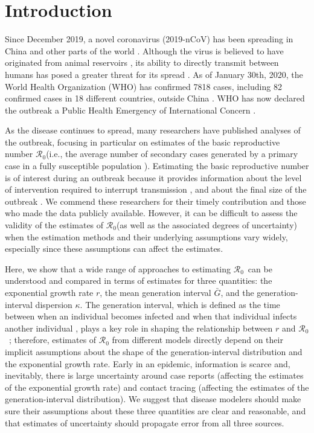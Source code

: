 \documentclass[12pt]{article}
\newcommand{\Rx}[1]{\ensuremath{{\mathcal R}_{#1}}}
\newcommand{\Ro}{\Rx{0}\xspace}
\begin{document}
\pagebreak

\section{Introduction}

Since December 2019, a novel coronavirus (2019-nCoV) has been spreading in China and other parts of the world \citep{pneumonia}.
Although the virus is believed to have originated from animal reservoirs \citep{cdcncov}, its ability to directly transmit between humans has posed a greater threat for its spread \citep{huang2020clinical,who26report}.
As of January 30th, 2020, the World Health Organization (WHO) has confirmed 7818 cases, including 82 confirmed cases in 18 different countries, outside China \citep{who28report}.
WHO has now declared the outbreak a Public Health Emergency of International Concern \citep{whoemer}.

As the disease continues to spread, many researchers have published analyses of the outbreak, focusing in particular on estimates of the basic reproductive number \Ro (i.e., the average number of secondary cases generated by a primary case in a fully susceptible population \citep{anderson1991infectious, diekmann1990definition}).
Estimating the basic reproductive number is of interest during an outbreak because it provides information about the level of intervention required to interrupt transmission \citep{anderson1991infectious}, and about the final size of the outbreak \citep{anderson1991infectious, ma2006generality}.
We commend these researchers for their timely contribution and those who made the data publicly available.
However, it can be difficult to assess the validity of the estimates of \Ro (as well as the associated degrees of uncertainty) when the estimation methods and their underlying assumptions vary widely, especially since these assumptions can affect the estimates.

Here, we show that a wide range of approaches to estimating \Ro\ can be understood and compared in terms of estimates for three quantities: the exponential growth rate $r$, the mean generation interval $\bar G$, and the generation-interval dispersion $\kappa$.
The generation interval, which is defined as the time between when an individual becomes infected and when that individual infects another individual \citep{svensson2007note}, plays a key role in shaping the relationship between $r$ and \Ro\ \citep{wearing2005appropriate, roberts2007model, wallinga2007generation, park2019practical};
therefore, estimates of $\mathcal R_0$ from different models directly depend on their implicit assumptions about the shape of the generation-interval distribution and the exponential growth rate.
Early in an epidemic, information is scarce and, inevitably, there is large uncertainty around case reports (affecting the estimates of the exponential growth rate) and contact tracing (affecting the estimates of the generation-interval distribution).
We suggest that disease modelers should make sure their assumptions about these three quantities are clear and reasonable, and that estimates of uncertainty should propagate error from all three sources.
\end{document}
